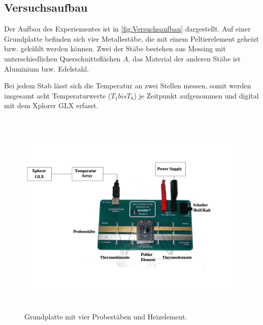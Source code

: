 \subsection{Versuchsaufbau}
\label{sec:Versuchsaufbau}

Der Aufbau des Experiementes ist in \autoref{fig:Versuchsaufbau} dargestellt.
Auf einer Grundplatte befinden sich vier Metallestäbe, die mit einem Peltierelement geheizt bzw. gekühlt werden können.
Zwei der Stäbe bestehen aus Messing mit unterschiedlichen Querschnittsflächen $A$, das Material der anderen Stäbe ist
Aluminium bzw. Edelstahl.

Bei jedem Stab lässt sich die Temperatur an zwei Stellen messen, somit werden insgesamt acht Temperaturwerte ($T_{1} bis T_{8}$) je
Zeitpunkt aufgenommen und digital mit dem \glqq Xplorer GLX\grqq{} erfasst.

\begin{figure} [H]
    \centering
    \includegraphics[height=10cm]{content/Abbildungen/Versuchsaufbau.pdf}
    \caption{Grundplatte mit vier Probestäben und Heizelement.\cite{v204}}
    \label{fig:Versuchsaufbau}
\end{figure}